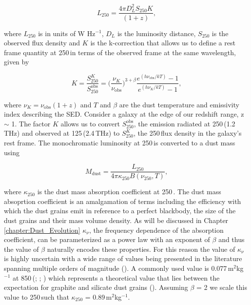 \begin{equation}
    L_{250} = \frac{4\pi D_L^2 S_{250}K}{(1+z)},
\label{eq:monohromatic_luminosities}
\end{equation}

\noindent where $L_{250}$ is in units of W Hz$^{-1}$, $D_L$ is the luminosity distance, $S_{250}$ is the observed flux density and $K$ is the k-correction that allows us to define a rest frame quantity at 250\,\micron in terms of the observed frame at the same wavelength, given by

\begin{equation}
    K = \frac{S_{250}^{K}}{S_{250}^{\textrm{obs}}} = \Bigg(\frac{\nu_{K}}{\nu_{\textrm{obs}}}\Bigg)^{3+\beta}\frac{e^{(h\nu_{\textrm{obs}}/kT)} - 1}{e^{(h\nu_{K}/kT)} - 1},
\label{eq:k_correction}
\end{equation}

\noindent where $\nu_{K} = \nu_{\textrm{obs}}(1+z)$ and $T$ and $\beta$ are the dust temperature and emissivity index describing the SED. Consider a galaxy at the edge of our redshift range, z $\sim$ 1. The factor $K$ allows us to convert $S_{250}^{\textrm{obs}}$, the emission radiated at 250\,\micron (1.2\,THz) and observed at 125\,\micron (2.4\,THz) to $S_{250}^{K}$, the 250\,\micron flux density in the galaxy's rest frame. The monochromatic luminosity at 250\,\micron is converted to a dust mass using

\begin{equation}
    M_{\textrm{dust}} = \frac{L_{250}}{4\pi\kappa_{250}B(\nu_{250}, T)},
\label{fig:dust_mass}
\end{equation}

\noindent where $\kappa_{250}$ is the dust mass absorption coefficient at 250\,\micron. The dust mass absoprtion coefficient is an amalgamation of terms including the efficiency with which the dust grains emit in reference to a perfect blackbody, the size of the dust grains and their mass volume density. As will be discussed in Chapter \ref{chapter:Dust_Evolution} $\kappa_\nu$, the frequency dependence of the absorption coefficient, can be parameterized as a power law with an exponent of $\beta$ and thus the value of $\beta$ naturally encodes these properties. For this reason the value of $\kappa_\nu$ is highly uncertain with a wide range of values being presented in the literature spanning multiple orders of magnitude (\citealt{Clark_2019}). A commonly used value is 0.077\,m$^{2}$kg$^{-1}$ at 850\,\micron (\citealt{Dunne_2000}; \citealt{daCunha_2008}; \citealt{Dunne_2011}) which represents a theoretical value that lies between the expectation for graphite and silicate dust grains (\citealt{Draine_1984}). Assuming $\beta$ = 2 we scale this value to 250\,\micron such that $\kappa_{250}$ = 0.89\,m$^{2}$kg$^{-1}$.


